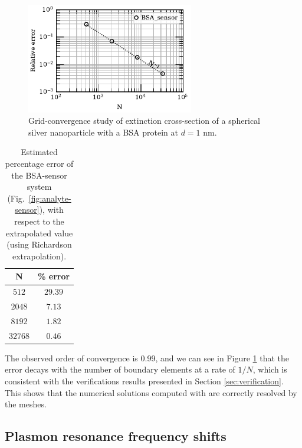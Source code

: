 \begin{figure}[h] %
    \centering
    \includegraphics[width=0.65\textwidth]{convergence_bsa_sensor_R8_d1_w380.pdf} 
    \caption{Grid-convergence study of extinction cross-section of a spherical silver
             nanoparticle with a BSA protein at $d=1$ nm.}
    \label{fig:err_sph-bsa}
 \end{figure}

 \begin{table}[h]
    \centering
    \caption{\label{table:err_sph-bsa} Estimated percentage error of the BSA-sensor 
    system (Fig.~\ref{fig:analyte-sensor}), with respect to the extrapolated value 
    (using Richardson extrapolation).} 
    \begin{tabular}{c c}
    \hline%
    N & \% error \\
    \hline%
     $512$ & $29.39$ \\
     $2048$ & $7.13$ \\
     $8192$ & $1.82$ \\
     $32768$ & $0.46$ \\
    \hline%
    \end{tabular}
\end{table}

The observed order of convergence is 0.99, and we can see in Figure
\ref{fig:err_sph-bsa} that the error decays with the number of boundary elements
at a rate of $1/N$, which is consistent with the verifications results presented
in Section \ref{sec:verification}. This shows that the numerical solutions computed
with \pygbe are correctly resolved by the meshes.

\subsection{Plasmon resonance frequency shifts} \label{sec:shift_bsa}

